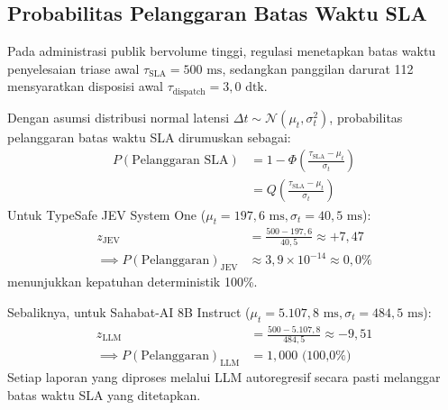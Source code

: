 \documentclass[journal,compsoc]{IEEEtran}
\begin{document}
\subsection{Probabilitas Pelanggaran Batas Waktu SLA}
Pada administrasi publik bervolume tinggi, regulasi menetapkan batas waktu penyelesaian triase awal $\tau_{\text{SLA}} = 500 \text{ ms}$, sedangkan panggilan darurat 112 mensyaratkan disposisi awal $\tau_{\text{dispatch}} = 3{,}0 \text{ dtk}$.

Dengan asumsi distribusi normal latensi $\Delta t \sim \mathcal{N}(\mu_t, \sigma_t^2)$, probabilitas pelanggaran batas waktu SLA dirumuskan sebagai:
\begin{equation}
\begin{aligned}
P(\text{Pelanggaran SLA}) &= 1 - \Phi\left(\frac{\tau_{\text{SLA}} - \mu_t}{\sigma_t}\right) \\
&= Q\left(\frac{\tau_{\text{SLA}} - \mu_t}{\sigma_t}\right)
\end{aligned}
\end{equation}
Untuk TypeSafe JEV System One ($\mu_t = 197{,}6 \text{ ms}, \sigma_t = 40{,}5 \text{ ms}$):
\begin{equation}
\begin{aligned}
z_{\text{JEV}} &= \frac{500 - 197{,}6}{40{,}5} \approx +7{,}47 \\
\implies P(\text{Pelanggaran})_{\text{JEV}} &\approx 3{,}9 \times 10^{-14} \approx 0{,}0\%
\end{aligned}
\end{equation}
menunjukkan kepatuhan deterministik 100\%.

Sebaliknya, untuk Sahabat-AI 8B Instruct ($\mu_t = 5.107{,}8 \text{ ms}, \sigma_t = 484{,}5 \text{ ms}$):
\begin{equation}
\begin{aligned}
z_{\text{LLM}} &= \frac{500 - 5.107{,}8}{484{,}5} \approx -9{,}51 \\
\implies P(\text{Pelanggaran})_{\text{LLM}} &= 1{,}000 \text{ (100,0\%)}
\end{aligned}
\end{equation}
Setiap laporan yang diproses melalui LLM autoregresif secara pasti melanggar batas waktu SLA yang ditetapkan.
\end{document}
